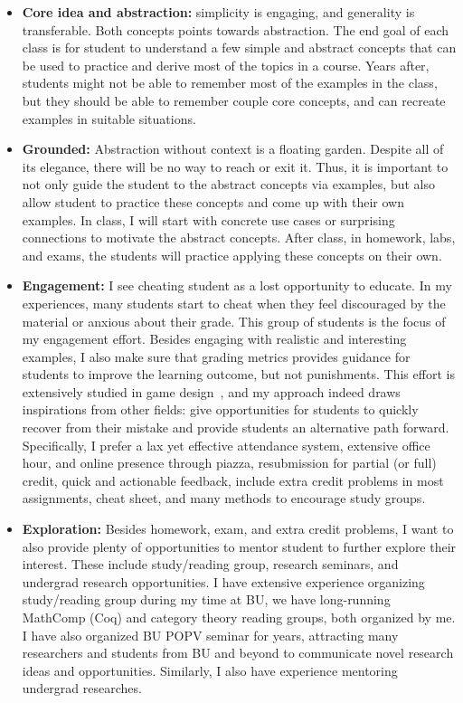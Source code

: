 \documentclass[11pt,a4paper,sans]{moderncv} %
\begin{document}
\begin{itemize}
  \item \textbf{Core idea and abstraction:} simplicity is engaging, and generality is transferable. 
  Both concepts points towards abstraction. 
  The end goal of each class is for student to understand a few simple and abstract concepts that can be used to practice and derive most of the topics in a course. 
  Years after, students might not be able to remember most of the examples in the class, but they should be able to remember couple core concepts, and can recreate examples in suitable situations.
  \item \textbf{Grounded:} Abstraction without context is a floating garden. Despite all of its elegance, there will be no way to reach or exit it.
  Thus, it is important to not only guide the student to the abstract concepts via examples, but also allow student to practice these concepts and come up with their own examples.
  In class, I will start with concrete use cases or surprising connections to motivate the abstract concepts. 
  After class, in homework, labs, and exams, the students will practice applying these concepts on their own.
  \item \textbf{Engagement:} I see cheating student as a lost opportunity to educate.
  In my experiences, many students start to cheat when they feel discouraged by the material or anxious about their grade. 
  This group of students is the focus of my engagement effort. 
  Besides engaging with realistic and interesting examples, I also make sure that grading metrics provides guidance for students to improve the learning outcome, but not punishments.
  This effort is extensively studied in game design~\cite{engelstein_AchievementRelockedLoss_2020,lewis_MotivationalGameDesign_2012}, and my approach indeed draws inspirations from other fields: give opportunities for students to quickly recover from their mistake and provide students an alternative path forward.
  Specifically, I prefer a lax yet effective attendance system, extensive office hour, and online presence through piazza, resubmission for partial (or full) credit, quick and actionable feedback, include extra credit problems in most assignments, cheat sheet, and many methods to encourage study groups. 
  \item \textbf{Exploration:} Besides homework, exam, and extra credit problems, I want to also provide plenty of opportunities to mentor student to further explore their interest. 
  These include study/reading group, research seminars, and undergrad research opportunities.
  I have extensive experience organizing study/reading group during my time at BU, we have long-running MathComp (Coq) and category theory reading groups, both organized by me. 
  I have also organized BU POPV seminar for years, attracting many researchers and students from BU and beyond to communicate novel research ideas and opportunities.
  Similarly, I also have experience mentoring undergrad researches.
\end{itemize}
\end{document}
